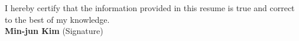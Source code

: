 \documentclass[10pt,a4paper]{article}
\begin{document}
\vfill

\begin{center}
  \textcolor{textMuted}{\scriptsize I hereby certify that the information provided in this resume is true and correct to the best of my knowledge.} \\
  \vspace{0.3cm}
  {\large\color{primaryAccent}\bfseries Min-jun Kim} \quad \textcolor{textMuted}{(Signature)}
\end{center}
\end{document}
